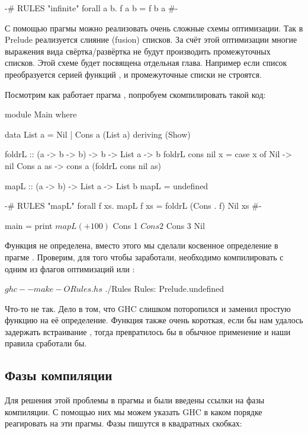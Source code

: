 \begin{code}
{-# RULES
        "infinite"  forall a b. f a b = f b a 
#-}
\end{code}
  

С помощью прагмы  можно реализовать очень сложные 
схемы оптимизации. Так в Prelude реализуется слияние (fusion) списков.
За счёт этой оптимизации многие выражения вида свёртка/развёртка
не будут производить промежуточных списков. Этой схеме будет
посвящена отдельная глава. Например если список
преобразуется серией функций ,  и 
промежуточные списки не строятся. 

Посмотрим как работает прагма , попробуем 
скомпилировать такой код:

\begin{code}
module Main where

data List a = Nil | Cons a (List a)
    deriving (Show)

foldrL :: (a -> b -> b) -> b -> List a -> b
foldrL cons nil x = case x of
    Nil         -> nil
    Cons a as   -> cons a (foldrL cons nil as) 

mapL :: (a -> b) -> List a -> List b
mapL = undefined

{-# RULES  
"mapL"   forall f xs.
        mapL f xs = foldrL (Cons . f) Nil xs
  #-}

main = print $ mapL (+100) $ Cons 1 $ Cons 2 $ Cons 3 Nil
\end{code}
  
Функция  не определена, вместо этого мы
сделали косвенное определение в прагме .
Проверим, для того чтобы  заработали, необходимо
компилировать с одним из флагов оптимизаций  или :

\begin{code}
$ ghc --make -O Rules.hs 
$ ./Rules
Rules: Prelude.undefined
\end{code}

Что-то не так. Дело в том, что GHC слишком поторопился
и заменил простую функцию  на её определение.
Функция \In{$} также очень короткая, если бы нам удалось
задержать встраивание , тогда \In{$} превратилось
бы в обычное применение и наши правила сработали бы.  

\subsection{Фазы компиляции}

Для решения этой проблемы в прагмы  и 
были введены ссылки на фазы компиляции. С помощью них мы
можем указать GHC в каком порядке реагировать на эти прагмы.
Фазы пишутся в квадратных скобках:

